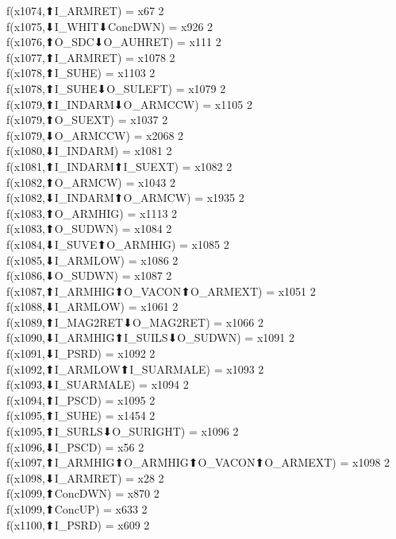 f(x1074,⬆I_ARMRET) = x67 {2} \\
f(x1075,⬇I_WHIT⬇ConcDWN) = x926 {2} \\
f(x1076,⬆O_SDC⬇O_AUHRET) = x111 {2} \\
f(x1077,⬆I_ARMRET) = x1078 {2} \\
f(x1078,⬆I_SUHE) = x1103 {2} \\
f(x1078,⬆I_SUHE⬇O_SULEFT) = x1079 {2} \\
f(x1079,⬆I_INDARM⬇O_ARMCCW) = x1105 {2} \\
f(x1079,⬆O_SUEXT) = x1037 {2} \\
f(x1079,⬇O_ARMCCW) = x2068 {2} \\
f(x1080,⬇I_INDARM) = x1081 {2} \\
f(x1081,⬆I_INDARM⬆I_SUEXT) = x1082 {2} \\
f(x1082,⬆O_ARMCW) = x1043 {2} \\
f(x1082,⬇I_INDARM⬆O_ARMCW) = x1935 {2} \\
f(x1083,⬆O_ARMHIG) = x1113 {2} \\
f(x1083,⬆O_SUDWN) = x1084 {2} \\
f(x1084,⬇I_SUVE⬆O_ARMHIG) = x1085 {2} \\
f(x1085,⬇I_ARMLOW) = x1086 {2} \\
f(x1086,⬇O_SUDWN) = x1087 {2} \\
f(x1087,⬆I_ARMHIG⬆O_VACON⬆O_ARMEXT) = x1051 {2} \\
f(x1088,⬇I_ARMLOW) = x1061 {2} \\
f(x1089,⬆I_MAG2RET⬇O_MAG2RET) = x1066 {2} \\
f(x1090,⬇I_ARMHIG⬆I_SUILS⬇O_SUDWN) = x1091 {2} \\
f(x1091,⬇I_PSRD) = x1092 {2} \\
f(x1092,⬆I_ARMLOW⬆I_SUARMALE) = x1093 {2} \\
f(x1093,⬇I_SUARMALE) = x1094 {2} \\
f(x1094,⬆I_PSCD) = x1095 {2} \\
f(x1095,⬆I_SUHE) = x1454 {2} \\
f(x1095,⬆I_SURLS⬇O_SURIGHT) = x1096 {2} \\
f(x1096,⬇I_PSCD) = x56 {2} \\
f(x1097,⬆I_ARMHIG⬆O_ARMHIG⬆O_VACON⬆O_ARMEXT) = x1098 {2} \\
f(x1098,⬇I_ARMRET) = x28 {2} \\
f(x1099,⬆ConcDWN) = x870 {2} \\
f(x1099,⬆ConcUP) = x633 {2} \\
f(x1100,⬆I_PSRD) = x609 {2} \\

